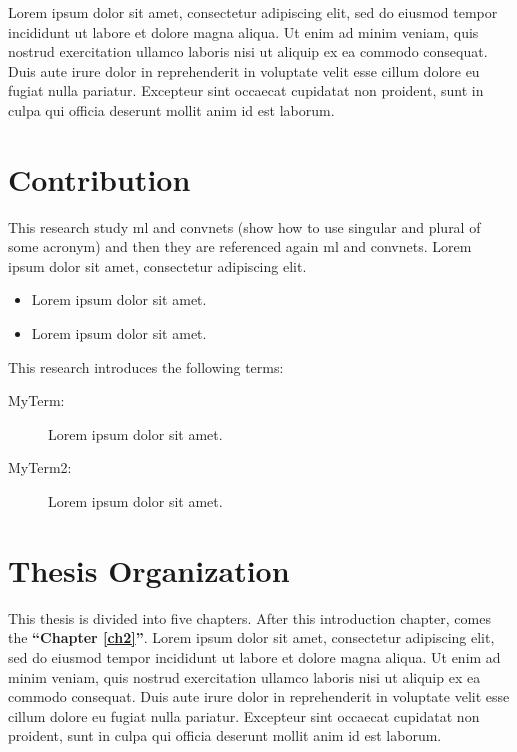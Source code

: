 Lorem ipsum dolor sit amet, consectetur adipiscing elit,
sed do eiusmod tempor incididunt ut labore et dolore magna aliqua.
Ut enim ad minim veniam, quis nostrud exercitation ullamco laboris nisi ut aliquip ex ea commodo consequat.
Duis aute irure dolor in reprehenderit in voluptate velit esse cillum dolore eu fugiat nulla pariatur.
Excepteur sint occaecat cupidatat non proident, sunt in culpa qui officia deserunt mollit anim id est laborum.

\section{Contribution}

This research study \gls{ml} and \glspl{convnet} (show how to use singular and plural of some acronym)
and then they are referenced again \gls{ml} and \glspl{convnet}.
Lorem ipsum dolor sit amet, consectetur adipiscing elit.

\begin{itemize}
\item Lorem ipsum dolor sit amet. 
\item Lorem ipsum dolor sit amet. 
\end{itemize}

This research introduces the following terms:

\begin{description}
\item [MyTerm:] Lorem ipsum dolor sit amet. 
\item [MyTerm2:] Lorem ipsum dolor sit amet. 
\end{description}


\section{Thesis Organization}

This thesis is divided into five chapters.
After this introduction chapter, comes the \textbf{``Chapter \ref{ch2}''}.
Lorem ipsum dolor sit amet, consectetur adipiscing elit,
sed do eiusmod tempor incididunt ut labore et dolore magna aliqua.
Ut enim ad minim veniam, quis nostrud exercitation ullamco laboris nisi ut aliquip ex ea commodo consequat.
Duis aute irure dolor in reprehenderit in voluptate velit esse cillum dolore eu fugiat nulla pariatur.
Excepteur sint occaecat cupidatat non proident, sunt in culpa qui officia deserunt mollit anim id est laborum.


